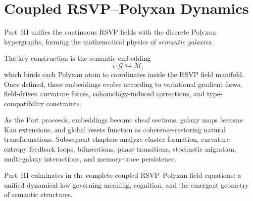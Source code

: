 \part{Coupled RSVP--Polyxan Dynamics}

Part~III unifies the continuous RSVP fields with the discrete Polyxan
hypergraphs, forming the mathematical physics of \emph{semantic galaxies}.

The key construction is the semantic embedding
\[
  \iota : \mathcal{G} \hookrightarrow \mathcal{M},
\]
which binds each Polyxan atom to coordinates inside the RSVP field
manifold. Once defined, these embeddings evolve according to variational
gradient flows, field-driven curvature forces, cohomology-induced
corrections, and type-compatibility constraints.

As the Part proceeds, embeddings become sheaf sections, galaxy maps
become Kan extensions, and global resets function as
coherence-restoring natural transformations. Subsequent chapters
analyze cluster formation, curvature--entropy feedback loops,
bifurcations, phase transitions, stochastic migration, multi-galaxy
interactions, and memory-trace persistence.

Part~III culminates in the complete coupled RSVP--Polyxan field
equations: a unified dynamical law governing meaning, cognition, and the
emergent geometry of semantic structures.

\cleardoublepage
